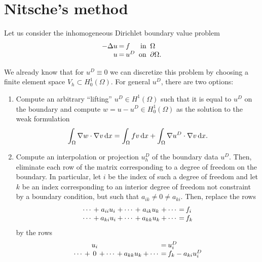 \section{Nitsche's method}
\label{sec:nitsches-method}

\begin{intro}
Let us consider the inhomogeneous Dirichlet boundary value problem
\begin{gather}
  \label{eq:nitsche:1}
    \arraycolsep1pt
  \begin{array}{rclrl}
    -\Delta u &=& f
    &\text{ in }&\Omega\\
    u &=& u^D &\text{ on }&\partial\Omega.
  \end{array}
\end{gather}

We already know that for $u^D\equiv 0$ we can discretize this problem
by choosing a finite element space $V_h \subset H^1_0(\Omega)$. For
general $u^D$, there are two options:
\begin{enumerate}
\item Compute an arbitrary ``lifting'' $u^D\in H^1(\Omega)$ such that
  it is equal to $u^D$ on the boundary and compute
  $w=u-u^D \in H^1_0(\Omega)$ as the solution to the weak formulation
  \begin{gather}
    \label{eq:nitsche:1a}
    \int_\Omega \nabla w\cdot\nabla v\,\mathrm{d} x
    = \int_\Omega f v\,\mathrm{d} x
    + \int_\Omega \nabla u^D\cdot\nabla v\,\mathrm{d} x.
  \end{gather}
\item Compute an interpolation or projection $u^D_h$ of the boundary
  data $u^D$. Then, eliminate each row of the matrix corresponding to
  a degree of freedom on the boundary. In particular, let $i$ be the
  index of such a degree of freedom and let $k$ be an index
  corresponding to an interior degree of freedom not constraint by a
  boundary condition, but such that $a_{ik}\neq 0 \neq a_{ki}$. Then,
  replace the rows
  \begin{gather}
    \arraycolsep1pt
    \begin{array}{ccccccccccl}
      \cdots &+& a_{ii} u_i &+& \cdots &+& a_{ik} u_k &+& \cdots &=& f_i \\
      \cdots &+& a_{ki} u_i &+& \cdots &+& a_{kk} u_k &+& \cdots &=& f_k
    \end{array}
  \end{gather}
  by the rows
  \begin{gather}
    \arraycolsep1pt
    \begin{array}{ccccccccccl}
      && u_i &&  && &&  &=& u^D_i \\
      \cdots &+& 0 &+& \cdots &+& a_{kk} u_k &+& \cdots &=& f_k - a_{ki} u^D_i
    \end{array}
  \end{gather}
\end{enumerate}


\end{intro}

